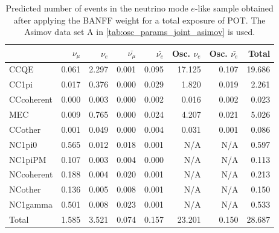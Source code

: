 
\begin{table}
\center
\begin{tabular} { | l ||r | r | r | r | r | r | | r | }
\hline
              & $\nu_\mu$            & $\nu_e$              & $\bar{\nu_\mu}$      & $\bar{\nu_e}$        & Osc. $\nu_e$         & Osc. $\bar{\nu_e}$   & Total                \\ \hline\hline
 CCQE         & 0.061                & 2.297                & 0.001                & 0.095                & 17.125               & 0.107                & 19.686               \\ \hline
 CC1pi        & 0.017                & 0.376                & 0.000                & 0.029                & 1.820                & 0.019                & 2.261                \\ \hline
 CCcoherent   & 0.000                & 0.003                & 0.000                & 0.002                & 0.016                & 0.002                & 0.023                \\ \hline
 MEC          & 0.009                & 0.765                & 0.000                & 0.024                & 4.207                & 0.021                & 5.026                \\ \hline
 CCother      & 0.001                & 0.049                & 0.000                & 0.004                & 0.031                & 0.001                & 0.086                \\ \hline
 NC1pi0       & 0.565                & 0.012                & 0.018                & 0.001                & N/A                  & N/A                  & 0.597                \\ \hline
 NC1piPM      & 0.107                & 0.003                & 0.004                & 0.000                & N/A                  & N/A                  & 0.113                \\ \hline
 NCcoherent   & 0.188                & 0.004                & 0.020                & 0.001                & N/A                  & N/A                  & 0.213                \\ \hline
 NCother      & 0.136                & 0.005                & 0.008                & 0.001                & N/A                  & N/A                  & 0.150                \\ \hline
 NC1gamma     & 0.501                & 0.008                & 0.023                & 0.001                & N/A                  & N/A                  & 0.533                \\ \hline
\hline
 Total        & 1.585                & 3.521                & 0.074                & 0.157                & 23.201               & 0.150                & 28.687               \\ \hline

\end{tabular}
\caption{
Predicted number of events in the neutrino mode $e$-like sample
obtained after applying the BANFF weight
for a total exposure of \TotalPotNuRunOneSevenC{} POT.
The Asimov data set A in \cref{tab:osc_params_joint_asimov} is used.
}
\label{tab:events_1re_Asimov_A_Run17c}
\end{table}


